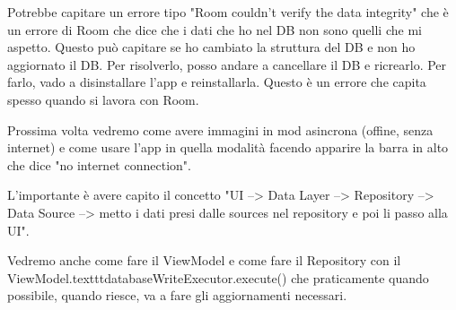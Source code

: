 \par Potrebbe capitare un errore tipo "Room couldn't verify the data integrity" che è un errore di Room che dice che i dati che ho nel DB non sono quelli che mi aspetto. Questo può capitare se ho cambiato la struttura del DB e non ho aggiornato il DB. Per risolverlo, posso andare a cancellare il DB e ricrearlo. Per farlo, vado a disinstallare l'app e reinstallarla. Questo è un errore che capita spesso quando si lavora con Room.
\par Prossima volta vedremo come avere immagini in mod asincrona (offine, senza internet) e come usare l'app in quella modalità facendo apparire la barra in alto che dice "no internet connection".
\par L'importante è avere capito il concetto "UI --> Data Layer --> Repository --> Data Source --> metto i dati presi dalle sources nel repository e poi li passo alla UI".
\par Vedremo anche come fare il ViewModel e come fare il Repository con il ViewModel.texttt{databaseWriteExecutor.execute()} che praticamente quando possibile, quando riesce, va a fare gli aggiornamenti necessari.